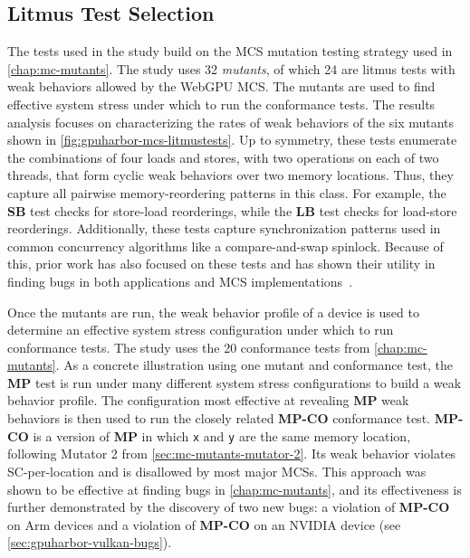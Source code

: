 \subsection{Litmus Test Selection \label{sec:gpuharbor-litmus-selection}}

The tests used in the study build on the MCS mutation testing strategy used in \mychap\ref{chap:mc-mutants}. The study uses 32 \textit{mutants}, of which 24 are litmus tests with weak behaviors allowed by the WebGPU MCS. The mutants are used to find effective system stress under which to run the conformance tests. The results analysis focuses on characterizing the rates of weak behaviors of the six mutants shown in \myfig\ref{fig:gpuharbor-mcs-litmustests}. Up to symmetry, these tests enumerate the combinations of four loads and stores, with two operations on each of two threads, that form cyclic weak behaviors over two memory locations. Thus, they capture all pairwise memory-reordering patterns in this class. For example, the \textbf{SB} test checks for store-load reorderings, while the \textbf{LB} test checks for load-store reorderings. Additionally, these tests capture synchronization patterns used in common concurrency algorithms like a compare-and-swap spinlock. Because of this, prior work has also focused on these tests and has shown their utility in finding bugs in both applications and MCS implementations~\cite{sorensen2016exposing,kirkham2020foundations}.

Once the mutants are run, the weak behavior profile of a device is used to determine an effective system stress configuration under which to run conformance tests. The study uses the 20 conformance tests from \mychap\ref{chap:mc-mutants}. As a concrete illustration using one mutant and conformance test, the \textbf{MP} test is run under many different system stress configurations to build a weak behavior profile. The configuration most effective at revealing \textbf{MP} weak behaviors is then used to run the closely related \textbf{MP-CO} conformance test. \textbf{MP-CO} is a version of \textbf{MP} in which \texttt{x} and \texttt{y} are the same memory location, following Mutator 2 from \mysec\ref{sec:mc-mutants-mutator-2}. Its weak behavior violates SC-per-location and is disallowed by most major MCSs. This approach was shown to be effective at finding bugs in \mychap\ref{chap:mc-mutants}, and its effectiveness is further demonstrated by the discovery of two new bugs: a violation of \textbf{MP-CO} on Arm devices and a violation of \textbf{MP-CO} on an NVIDIA device (see \mysec\ref{sec:gpuharbor-vulkan-bugs}).

